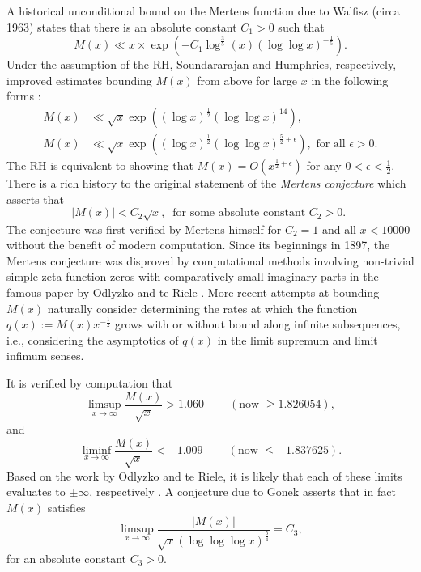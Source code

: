 \documentclass[11pt,reqno,a4letter]{article}
\numberwithin{figure}{section}
\numberwithin{table}{section}
\newcommand{\cf}{\textit{cf.\ }}
\newcommand{\seqnum}[1]{\href{http://oeis.org/#1}{\color{ProcessBlue}{\underline{#1}}}}
\theoremstyle{plain}
\numberwithin{theorem}{section}
\theoremstyle{definition}
\begin{document}
A historical unconditional bound on the Mertens function due to Walfisz (circa 1963) 
states that there is an absolute constant $C_1 > 0$ such that 
$$M(x) \ll x \times \exp\left(-C_1 \log^{\frac{3}{5}}(x) 
  (\log\log x)^{-\frac{1}{5}}\right).$$ 
Under the assumption of the RH, Soundararajan and Humphries, respectively, 
improved estimates bounding $M(x)$ from above for large $x$ in the 
following forms 
\cite{SOUND-MERTENS-ANNALS,HUMPHRIES-JNT-2013}: 
\begin{align*} 
M(x) & \ll \sqrt{x} \exp\left((\log x)^{\frac{1}{2}} (\log\log x)^{14}\right), \\ 
M(x) & \ll \sqrt{x} \exp\left( 
     (\log x)^{\frac{1}{2}} (\log\log x)^{\frac{5}{2}+\epsilon}\right), 
     \text{ for all } \epsilon > 0. 
\end{align*} 
The RH is equivalent to showing that 
$M(x) = O\left(x^{\frac{1}{2}+\epsilon}\right)$ for any 
$0 < \epsilon < \frac{1}{2}$. 
There is a rich history to the original statement of the \emph{Mertens conjecture} which 
asserts that 
\[ 
|M(x)| < C_2 \sqrt{x},\ \text{ for some absolute constant $C_2 > 0$. }
\] 
The conjecture was first verified by Mertens himself for $C_2 = 1$ and all $x < 10000$ 
without the benefit of modern computation. 
Since its beginnings in 1897, the Mertens conjecture was disproved by computational methods involving 
non-trivial simple zeta function zeros with comparatively small imaginary parts in the famous paper by 
Odlyzko and te Riele \cite{ODLYZ-TRIELE}. 
More recent attempts 
at bounding $M(x)$ naturally consider determining the rates at which the function 
$q(x) := M(x) x^{-\frac{1}{2}}$ grows with or without bound along infinite 
subsequences, i.e., considering the asymptotics of $q(x)$ 
in the limit supremum and limit infimum senses. 

It is verified by computation 
that \cite[\cf \S 4.1]{PRIMEREC} 
\cite[\cf \seqnum{A051400}; \seqnum{A051401}]{OEIS} 
\[
\limsup_{x\rightarrow\infty} \frac{M(x)}{\sqrt{x}} > 1.060\ \qquad (\text{now } \geq 1.826054), 
\] 
and 
\[ 
\liminf_{x\rightarrow\infty} \frac{M(x)}{\sqrt{x}} < -1.009\ \qquad (\text{now } \leq -1.837625). 
\] 
Based on the work by Odlyzko and te Riele, it is likely that 
each of these limits evaluates to $\pm \infty$, respectively 
\cite{ODLYZ-TRIELE,MREVISITED,ORDER-MERTENSFN,HURST-2017}. 
A conjecture due to Gonek asserts that in fact 
$M(x)$ satisfies \cite{NG-MERTENS}
$$\limsup_{x \rightarrow \infty} \frac{|M(x)|}{\sqrt{x} (\log\log\log x)^{\frac{5}{4}}} = C_3,$$ 
for an absolute constant $C_3 > 0$. 
\end{document}
